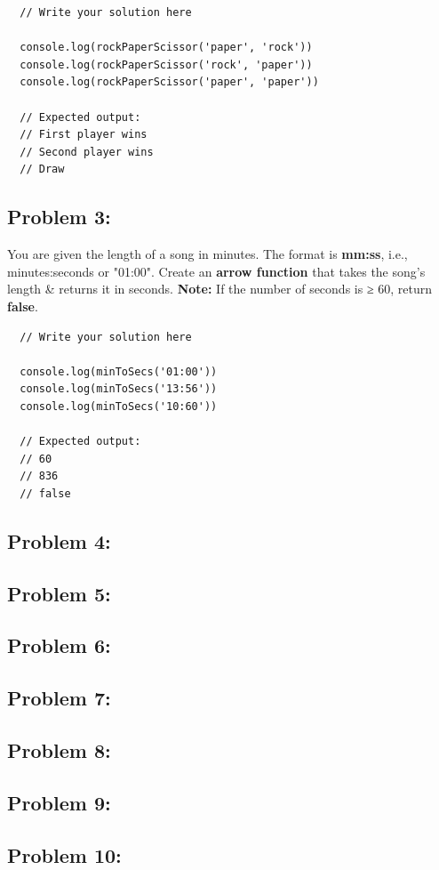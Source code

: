 \documentclass{article}
\begin{document}
\begin{verbatim}
  // Write your solution here

  console.log(rockPaperScissor('paper', 'rock'))
  console.log(rockPaperScissor('rock', 'paper'))
  console.log(rockPaperScissor('paper', 'paper'))

  // Expected output:
  // First player wins
  // Second player wins
  // Draw
\end{verbatim}

\subsection*{Problem 3:}
You are given the length of a song in minutes. The format is \textbf{mm:ss}, i.e., minutes:seconds or "01:00". Create an \textbf{arrow function} that takes the song's length \& returns it in seconds. \textbf{Note:} If the number of seconds is ≥ 60, return \textbf{false}.

\begin{verbatim}
  // Write your solution here

  console.log(minToSecs('01:00'))
  console.log(minToSecs('13:56'))
  console.log(minToSecs('10:60'))

  // Expected output:
  // 60
  // 836
  // false
\end{verbatim}

\subsection*{Problem 4:}

\subsection*{Problem 5:}

\subsection*{Problem 6:}

\subsection*{Problem 7:}

\subsection*{Problem 8:}

\subsection*{Problem 9:}

\subsection*{Problem 10:}
\end{document}
